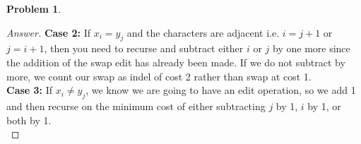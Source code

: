 \documentclass[11pt]{article}
\theoremstyle{definition}
\theoremstyle{definition}
\newtheorem{required}{Problem}
\theoremstyle{definition}
\begin{document}
\begin{required}
\begin{proof}[Answer]
\textbf{Case 2: } If $x_i = y_j$ and the characters are adjacent i.e. $i = j + 1$ or $j = i + 1$, then you need to recurse and subtract either $i$ or $j$ by one more since the addition of the swap edit has already been made. If we do not subtract by more, we count our swap as indel of cost 2 rather than swap at cost 1.\\

\textbf{Case 3: } If $x_i \neq y_j$, we know we are going to have an edit operation, so we add 1 and then recurse on the minimum cost of either subtracting $j$ by 1, $i$ by 1, or both by 1.\\



\end{proof}
\end{required}



\end{document}
